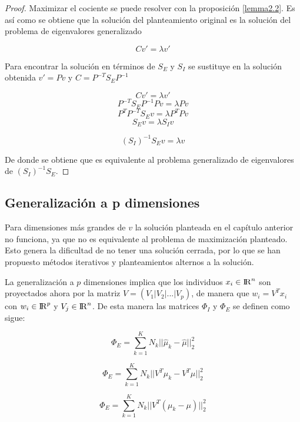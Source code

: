 \begin{proof}
 Maximizar el cociente se puede resolver con la proposición \ref{lemma2.2}. Es así como se obtiene que la solución del planteamiento original es la solución del problema de eigenvalores generalizado 

$$C v' = \lambda v'$$

Para encontrar la solución en términos de $S_E$ y $S_I$ se sustituye en la solución obtenida $v' = Pv$ y $C = P^{-T} S_E P^{-1}$

$$C v' = \lambda v'$$
$$P^{-T} S_E P^{-1} P v = \lambda P v$$
$$P^T P^{-T} S_E v = \lambda P^T P v$$
$$ S_E v = \lambda S_I v $$

\begin{equation} \label{eq:2.16}
(S_I)^{-1}S_E v = \lambda  v 	
\end{equation}
 
De donde se obtiene que es equivalente al problema generalizado de eigenvalores de $(S_I)^{-1} S_E$.

\end{proof}

\subsection{Generalización a p dimensiones}

Para dimensiones más grandes de $v$ la solución planteada en el capítulo anterior no funciona, ya que no es equivalente al problema de maximización planteado. Esto genera la dificultad de no tener una solución cerrada, por lo que se han propuesto métodos iterativos y planteamientos alternos a la solución.

La generalización a $p$ dimensiones implica que los individuos $x_i \in {\rm I\!R}^{n}$ son proyectados ahora por la matriz $V = (V_1 | V_2 | ... |V_p)$, de manera que $w_i = V^T x_i$ con $w_i \in {\rm I\!R}^{p}$ y $V_j \in {\rm I\!R}^{n}$. De esta manera las matrices $\Phi_I$ y $\Phi_E$ se definen como sigue:

\begin{equation*}
\Phi_E = \sum\limits_{k = 1}^{K} N_{k} ||\widehat{\mu}_k - \widehat{\mu}||_2^2
\end{equation*}

\begin{equation*}
\Phi_E = \sum\limits_{k = 1}^{K} N_{k} ||V^T \mu_k - V^T \mu||_2^2
\end{equation*}

\begin{equation*}
\Phi_E = \sum\limits_{k = 1}^{K} N_{k} ||V^T (\mu_k - \mu)||_2^2
\end{equation*}


